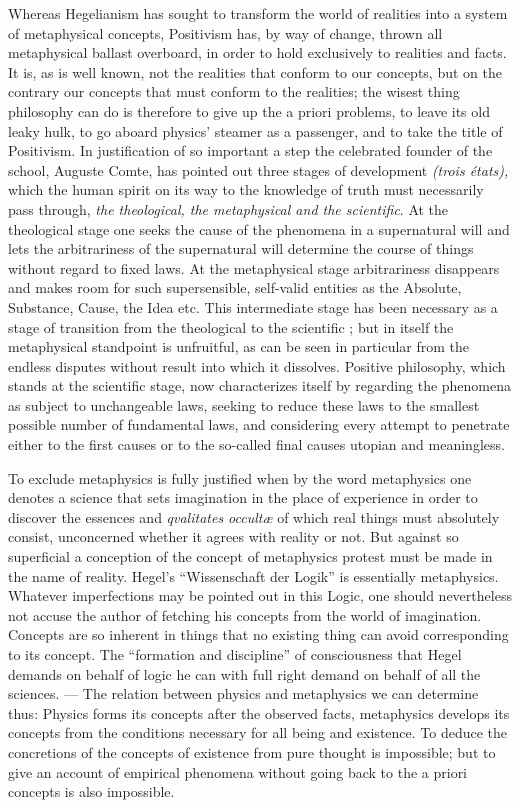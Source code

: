 \documentclass[12pt,a4paper,openany]{book}
\newcommand{\opage}[1]{\marginnote{\footnotesize\textit{[#1]}}}
\begin{document}
Whereas Hegelianism has sought to transform the world of realities into a system of
metaphysical concepts, Positivism has, by way of change, thrown all metaphysical
ballast overboard, in order to hold exclusively to realities and
\setcounter{footnote}{0}%
\opage{200}facts. It is, as is well known, not the realities that conform to our
concepts, but on the contrary our concepts that must conform to the realities; the
wisest thing philosophy can do is therefore to give up the a priori problems, to leave
its old leaky hulk, to go aboard physics' steamer as a passenger, and to take the title
of Positivism. In justification of so important a step the celebrated founder of the
school, Auguste Comte, has pointed out three stages of development
\textit{(trois états),} which the human spirit on its way to the knowledge of truth
must necessarily pass through, \emph{the theological, the metaphysical and the
scientific}. At the theological stage one seeks the cause of the phenomena in a
supernatural will and lets the arbitrariness of the supernatural will determine the
course of things without regard to fixed laws. At the metaphysical stage arbitrariness
disappears and makes room for such supersensible, self-valid entities as the Absolute,
Substance, Cause, the Idea etc. This intermediate stage has been necessary as a stage
of transition from the theological to the scientific
; but in itself the metaphysical standpoint is unfruitful, as can be seen in particular
from the endless disputes without result into which it dissolves. Positive philosophy,
which stands at the scientific stage, now characterizes itself by regarding the
phenomena as subject to unchangeable laws, seeking to reduce these laws to the
smallest possible number of fundamental laws, and considering every attempt to
penetrate either to the first causes or to the so-called final causes utopian and
meaningless.

To exclude metaphysics is fully justified when by the word metaphysics one denotes a
science that sets imagination in the place of experience in order to discover the
essences and \textit{qvalitates occultæ} of which real things must absolutely consist,
unconcerned whether it agrees with reality or not. But against so superficial a
conception of the concept of metaphysics protest must be made in the name of reality.
Hegel's
\setcounter{footnote}{0}%
\opage{201}``Wissenschaft der Logik'' is essentially metaphysics. Whatever imperfections
may be pointed out in this Logic, one should nevertheless not accuse the author of
fetching his concepts from the world of imagination. Concepts are so inherent in
things that no existing thing can avoid corresponding to its concept. The ``formation
and discipline'' of consciousness that Hegel demands on behalf of logic he can with
full right demand on behalf of all the sciences. --- The relation between physics and
metaphysics we can determine thus: Physics forms its concepts after the observed
facts, metaphysics develops its concepts from the conditions necessary for all being
and existence. To deduce the concretions of the concepts of existence from pure
thought is impossible; but to give an account of empirical phenomena without going
back to the a priori concepts is also impossible.
\end{document}
